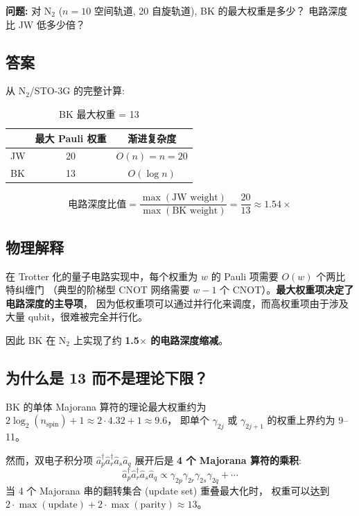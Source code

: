 \documentclass[fontset=mac]{ctexart}
\newcommand{\adag}[1]{\hat{a}_{#1}^\dagger}
\newcommand{\aop}[1]{\hat{a}_{#1}}
\begin{document}
\textbf{问题:} 对 N$_2$ ($n=10$ 空间轨道, 20 自旋轨道), BK 的最大权重是多少？
电路深度比 JW 低多少倍？

\subsection*{答案}

从 N$_2$/STO-3G 的完整计算:

\begin{table}[H]
\centering
\begin{tabular}{lcc}
\toprule
& \textbf{最大 Pauli 权重} & \textbf{渐进复杂度} \\
\midrule
JW     & 20 & $O(n) = n = 20$ \\
BK     & 13 & $O(\log n)$ \\
\bottomrule
\end{tabular}
\caption{BK 最大权重 = 13}
\end{table}

\begin{equation}
\boxed{\text{电路深度比值} = \frac{\max(\text{JW weight})}{\max(\text{BK weight})}
      = \frac{20}{13} \approx 1.54\times}
\end{equation}

\subsection*{物理解释}

在 Trotter 化的量子电路实现中，每个权重为 $w$ 的 Pauli 项需要 $O(w)$ 个两比特纠缠门
（典型的阶梯型 CNOT 网络需要 $w-1$ 个 CNOT）。\textbf{最大权重项决定了电路深度的主导项}，
因为低权重项可以通过并行化来调度，而高权重项由于涉及大量 qubit，很难被完全并行化。

因此 BK 在 N$_2$ 上实现了约 \textbf{1.5$\times$ 的电路深度缩减}。

\subsection*{为什么是 13 而不是理论下限？}

BK 的单体 Majorana 算符的理论最大权重约为 $2\log_2(n_{\text{spin}}) + 1 \approx 2\cdot 4.32 + 1 \approx 9.6$，
即单个 $\gamma_{2j}$ 或 $\gamma_{2j+1}$ 的权重上界约为 9--11。

然而，双电子积分项 $\adag{p}\adag{r}\aop{s}\aop{q}$ 展开后是 \textbf{4 个 Majorana 算符的乘积}:
\begin{equation}
    \adag{p}\adag{r}\aop{s}\aop{q}
    \propto \gamma_{2p}\gamma_{2r}\gamma_{2s}\gamma_{2q} + \cdots
\end{equation}
当 4 个 Majorana 串的翻转集合 (update set) 重叠最大化时，
权重可以达到 $2 \cdot \max(\text{update}) + 2 \cdot \max(\text{parity}) \approx 13$。
\end{document}
